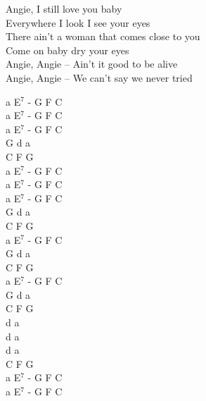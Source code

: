 \documentclass[a5paper, 10pt]{book}
\begin{document}
\begin{minipage}[t]{0.8\textwidth}
\hspace*{3mm} Angie, I still love you baby\\
\hspace*{3mm} Everywhere I look I see your eyes\\
\hspace*{3mm} There ain't a woman that comes close to you\\
\hspace*{3mm} Come on baby dry your eyes\\

Angie, Angie – Ain't it good to be alive\\
Angie, Angie – We can't say we never tried\\

\end{minipage}
\begin{minipage}[t]{0.2\textwidth}
a E$^7$ - G F C \\
a E$^7$ - G F C \\
a E$^7$ - G F C \\

G d a\\
C F G\\

a E$^7$ - G F C \\

a E$^7$ - G F C \\
a E$^7$ - G F C \\

G d a\\
C F G\\

a E$^7$ - G F C \\

G d a\\
C F G\\

a E$^7$ - G F C \\

G d a\\
C F G\\

d a\\
d a\\
d a\\
C F G\\

a E$^7$ - G F C \\
a E$^7$ - G F C \\

\end{minipage}
\end{document}
